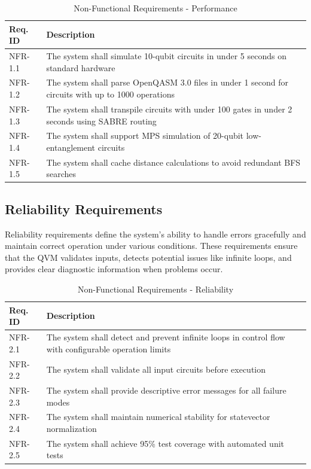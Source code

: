 \begin{table}[H]
\centering
\caption{Non-Functional Requirements - Performance}
\begin{tabular}{|p{2cm}|p{11cm}|}
\hline
\textbf{Req. ID} & \textbf{Description} \\
\hline
NFR-1.1 & The system shall simulate 10-qubit circuits in under 5 seconds on standard hardware \\
\hline
NFR-1.2 & The system shall parse OpenQASM 3.0 files in under 1 second for circuits with up to 1000 operations \\
\hline
NFR-1.3 & The system shall transpile circuits with under 100 gates in under 2 seconds using SABRE routing \\
\hline
NFR-1.4 & The system shall support MPS simulation of 20-qubit low-entanglement circuits \\
\hline
NFR-1.5 & The system shall cache distance calculations to avoid redundant BFS searches \\
\hline
\end{tabular}
\end{table}

\subsection{Reliability Requirements}

Reliability requirements define the system's ability to handle errors gracefully and maintain correct operation under various conditions. These requirements ensure that the QVM validates inputs, detects potential issues like infinite loops, and provides clear diagnostic information when problems occur.

\begin{table}[H]
\centering
\caption{Non-Functional Requirements - Reliability}
\begin{tabular}{|p{2cm}|p{11cm}|}
\hline
\textbf{Req. ID} & \textbf{Description} \\
\hline
NFR-2.1 & The system shall detect and prevent infinite loops in control flow with configurable operation limits \\
\hline
NFR-2.2 & The system shall validate all input circuits before execution \\
\hline
NFR-2.3 & The system shall provide descriptive error messages for all failure modes \\
\hline
NFR-2.4 & The system shall maintain numerical stability for statevector normalization \\
\hline
NFR-2.5 & The system shall achieve 95\% test coverage with automated unit tests \\
\hline
\end{tabular}
\end{table}

